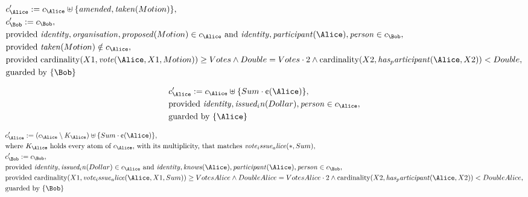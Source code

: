 \begin{align*}
&
c'_
{
\Alice
}
 := 
c_
{
\Alice
}
 \uplus 
\{
\mathit{
amended
}
,
\mathit{
taken
}
(
Motion
)
\}
,\\
&
c'_
{
\Bob
}
 := 
c_
{
\Bob
}
,\\
&
\text{provided } 
\mathit{
identity
}
,
\mathit{
organisation
}
,
\mathit{
proposed
}
(
Motion
)
 \in c_
{
\Alice
}
 \text{ and } 
\mathit{
identity
}
,
\mathit{
participant
}
(
\Alice
)
,
\mathit{
person
}
 \in c_
{
\Bob
}
,\\
&
\text{provided } 
\mathit{
taken
}
(
Motion
)
 \notin c_
{
\Alice
}
,\\
&
\text{provided } 
\mathrm{cardinality}(
X1
,
\mathit{
vote
}
(
\Alice
,
X1
,
Motion
)
)
\ge
Votes
\land
Double
=
Votes
\cdot
2
\land
\mathrm{cardinality}(
X2
,
\mathit{
has_participant
}
(
\Alice
,
X2
)
)
<
Double
,\\
&
\text{guarded by } \{
\Bob
\}
\end{align*}

\begin{align*}
&
c'_
{
\Alice
}
 := 
c_
{
\Alice
}
 \uplus 
\{
Sum
\cdot
\text{\textcent}
(
\Alice
)
\}
,\\
&
\text{provided } 
\mathit{
identity
}
,
\mathit{
issued_in
}
(
Dollar
)
,
\mathit{
person
}
 \in c_
{
\Alice
}
,\\
&
\text{guarded by } \{
\Alice
\}
\end{align*}

\begin{align*}
&
c'_
{
\Alice
}
 := 
(
c_
{
\Alice
}
 \setminus K_
{
\Alice
}
) \uplus 
\{
Sum
\cdot
\text{\textcent}
(
\Alice
)
\}
,\\
&
\text{where } K_
{
\Alice
}
 \text{ holds every atom of } c_
{
\Alice
}
 \text{, with its multiplicity, that matches } 
\mathit{
vote_issue_alice
}
(
\ast
,
Sum
)
,\\
&
c'_
{
\Bob
}
 := 
c_
{
\Bob
}
,\\
&
\text{provided } 
\mathit{
identity
}
,
\mathit{
issued_in
}
(
Dollar
)
 \in c_
{
\Alice
}
 \text{ and } 
\mathit{
identity
}
,
\mathit{
knows
}
(
\Alice
)
,
\mathit{
participant
}
(
\Alice
)
,
\mathit{
person
}
 \in c_
{
\Bob
}
,\\
&
\text{provided } 
\mathrm{cardinality}(
X1
,
\mathit{
vote_issue_alice
}
(
\Alice
,
X1
,
Sum
)
)
\ge
VotesAlice
\land
DoubleAlice
=
VotesAlice
\cdot
2
\land
\mathrm{cardinality}(
X2
,
\mathit{
has_participant
}
(
\Alice
,
X2
)
)
<
DoubleAlice
,\\
&
\text{guarded by } \{
\Bob
\}
\end{align*}
